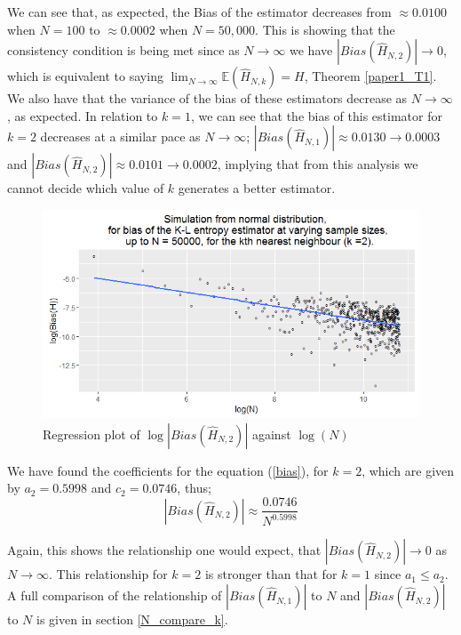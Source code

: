\documentclass{article}
\begin{document}
We can see that, as expected, the Bias of the estimator decreases from $\approx 0.0100$ when $N=100$ to $\approx 0.0002$ when $N=50,000$. This is showing that the consistency condition is being met since as $N \to \infty$ we have $|Bias(\hat{H}_{N, 2})| \to 0$, which is equivalent to saying $\lim_{N \to \infty} \mathbb{E} (\hat{H}_{N, k}) = H$, Theorem \ref{paper1_T1}. We also have that the variance of the bias of these estimators decrease as $N \to \infty$, as expected. In relation to $k=1$, we can see that the bias of this estimator for $k=2$ decreases at a similar pace as $N \to \infty$; $|Bias(\hat{H}_{N, 1})| \approx 0.0130 \to 0.0003$ and $|Bias(\hat{H}_{N, 2})| \approx 0.0101 \to 0.0002$, implying that from this analysis we cannot decide which value of $k$ generates a better estimator.

\begin{figure}
  \begin{center}
    \includegraphics[width=\textwidth]{./Graphs/Normal_k=2_plot.png}
  \end{center}
\caption{Regression plot of $\log|Bias(\hat{H}_{N, 2})|$ against $\log(N)$}
  \label{normal_k=2_graph}
\end{figure}

We have found the coefficients for the equation (\ref{bias}), for $k=2$, which are given by $a_{2} = 0.5998$ and $c_{2} = 0.0746$, thus;
\begin{equation}
|Bias(\hat{H}_{N, 2})| \approx \frac{0.0746}{N^{0.5998}} \nonumber
\end{equation}

Again, this shows the relationship one would expect, that $|Bias(\hat{H}_{N, 2})| \to 0$ as $N \to \infty$. This relationship for $k=2$ is stronger than that for $k=1$ since $a_{1} \leq a_{2}$. A full comparison of the relationship of $|Bias(\hat{H}_{N, 1})|$ to $N$ and $|Bias(\hat{H}_{N, 2})|$ to $N$ is given in section \ref{N_compare_k}.
\end{document}
